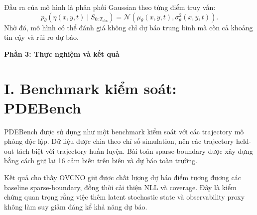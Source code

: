 \documentclass[a4paper, 12pt]{article}
\begin{document}
Đầu ra của mô hình là phân phối Gaussian theo từng điểm truy vấn:
\begin{equation}
p_\theta(\eta(x,y,t)\mid S_{0:T_{\mathrm{obs}}}) =
\mathcal{N}(\mu_\theta(x,y,t), \sigma_\theta^2(x,y,t)).
\end{equation}
Nhờ đó, mô hình có thể đánh giá không chỉ dự báo trung bình mà còn cả khoảng tin cậy và rủi ro dự báo.

\begin{center}
{\huge\bfseries Phần 3: Thực nghiệm và kết quả}
\end{center}

\section*{I. Benchmark kiểm soát: PDEBench}

PDEBench được sử dụng như một benchmark kiểm soát với các trajectory mô phỏng độc lập. Dữ liệu được chia theo chỉ số simulation, nên các trajectory held-out tách biệt với trajectory huấn luyện. Bài toán sparse-boundary được xây dựng bằng cách giữ lại 16 cảm biến trên biên và dự báo toàn trường.

\begin{table}[H]
\centering
\caption{Kết quả chính trên PDEBench 2D SWE.}
\end{table}

Kết quả cho thấy OVCNO giữ được chất lượng dự báo điểm tương đương các baseline sparse-boundary, đồng thời cải thiện NLL và coverage. Đây là kiểm chứng quan trọng rằng việc thêm latent stochastic state và observability proxy không làm suy giảm đáng kể khả năng dự báo.
\end{document}
